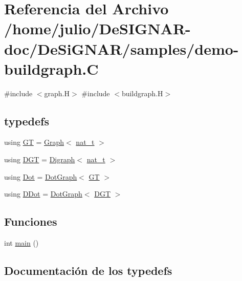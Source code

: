 \hypertarget{demo-buildgraph_8_c}{}\section{Referencia del Archivo /home/julio/\+De\+S\+I\+G\+N\+A\+R-\/doc/\+De\+Si\+G\+N\+A\+R/samples/demo-\/buildgraph.C}
\label{demo-buildgraph_8_c}
{\ttfamily \#include $<$graph.\+H$>$}\newline
{\ttfamily \#include $<$buildgraph.\+H$>$}\newline
\subsection*{typedefs}
\begin{DoxyCompactItemize}
\item 
using \hyperlink{demo-buildgraph_8_c_a3001c40d2c31ca87ed96cd7d1334a55e}{GT} = \hyperlink{class_designar_1_1_graph}{Graph}$<$ \hyperlink{namespace_designar_aa72662848b9f4815e7bf31a7cf3e33d1}{nat\+\_\+t} $>$
\item 
using \hyperlink{demo-buildgraph_8_c_ae73e956c2a8cf0a58255aa6b659985e0}{D\+GT} = \hyperlink{class_designar_1_1_digraph}{Digraph}$<$ \hyperlink{namespace_designar_aa72662848b9f4815e7bf31a7cf3e33d1}{nat\+\_\+t} $>$
\item 
using \hyperlink{demo-buildgraph_8_c_a70657b0b48a4d69ef850be3c5517ecc2}{Dot} = \hyperlink{class_designar_1_1_dot_graph}{Dot\+Graph}$<$ \hyperlink{demo-buildgraph_8_c_a3001c40d2c31ca87ed96cd7d1334a55e}{GT} $>$
\item 
using \hyperlink{demo-buildgraph_8_c_a0ffdd103a7285712ccbd9548ff5544e7}{D\+Dot} = \hyperlink{class_designar_1_1_dot_graph}{Dot\+Graph}$<$ \hyperlink{demo-buildgraph_8_c_ae73e956c2a8cf0a58255aa6b659985e0}{D\+GT} $>$
\end{DoxyCompactItemize}
\subsection*{Funciones}
\begin{DoxyCompactItemize}
\item 
int \hyperlink{demo-buildgraph_8_c_ae66f6b31b5ad750f1fe042a706a4e3d4}{main} ()
\end{DoxyCompactItemize}


\subsection{Documentación de los \textquotesingle{}typedefs\textquotesingle{}}
\mbox{\label{demo-buildgraph_8_c_a0ffdd103a7285712ccbd9548ff5544e7}} 

